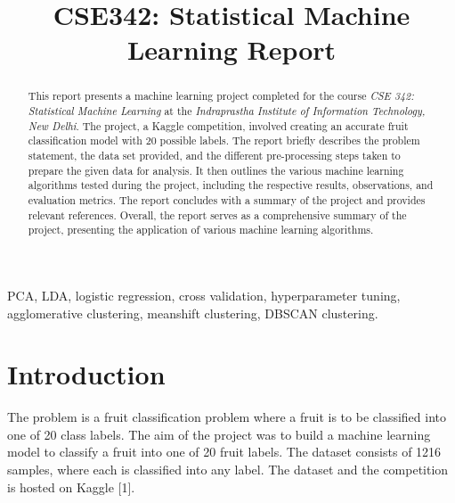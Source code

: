 \documentclass[conference]{IEEEtran}
\begin{document}
\title{CSE342: Statistical Machine Learning Report}
\makeatletter
\newcommand{\linebreakand}{%
  \end{@IEEEauthorhalign}
  \hfill\mbox{}\par
  \mbox{}\hfill\begin{@IEEEauthorhalign}
}
\makeatother

\author{
    \and
}

\maketitle

\begin{abstract}
    This report presents a machine learning project completed for the course \textit{CSE 342: Statistical Machine Learning} at the \textit{Indraprastha Institute of Information Technology, New Delhi}. The project, a Kaggle competition, involved creating an accurate fruit classification model with 20 possible labels. 
    The report briefly describes the problem statement, the data set provided, and the different pre-processing steps taken to prepare the given data for analysis. It then outlines the various machine learning algorithms tested during the project, including the respective results, observations, and evaluation metrics. 
    The report concludes with a summary of the project and provides relevant references. Overall, the report serves as a comprehensive summary of the project, presenting the application of various machine learning algorithms.
\end{abstract}
\begin{IEEEkeywords}
    PCA, LDA, logistic regression, cross validation, hyperparameter tuning, agglomerative clustering, meanshift clustering, DBSCAN clustering.
\end{IEEEkeywords}

\section{Introduction}
    The problem is a fruit classification problem where a fruit is to be classified into one of 20 class labels.
    The aim of the project was to build a machine learning model to classify a fruit into one of 20 fruit labels. The dataset consists of 1216 samples, where each is classified into any label. The dataset and the competition is hosted on Kaggle [1]. 
\end{document}
